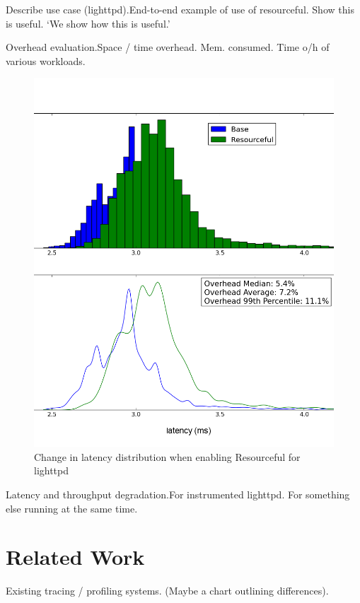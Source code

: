 \documentclass[letterpaper,twocolumn,10pt]{article}
\newcommand{\pname}{Resourceful}
\begin{document}
Describe use case (lighttpd).\newline End-to-end example of use of resourceful.
Show this is useful. `We show how this is useful.'

Overhead evaluation.\newline Space / time overhead. Mem. consumed. Time o/h of
various workloads.

\begin{figure}[ht!] 
	\centering 
	\includegraphics[width=1.1\columnwidth]{dist_and_fit}
	\caption{Change in latency distribution when enabling \pname{ }for lighttpd} 
	\label{fig:experiment1}
\end{figure}

Latency and throughput degradation.\newline For instrumented lighttpd. For
something else running at the same time.


\section{Related Work} Existing tracing / profiling systems. (Maybe a chart
outlining differences).
\end{document}

